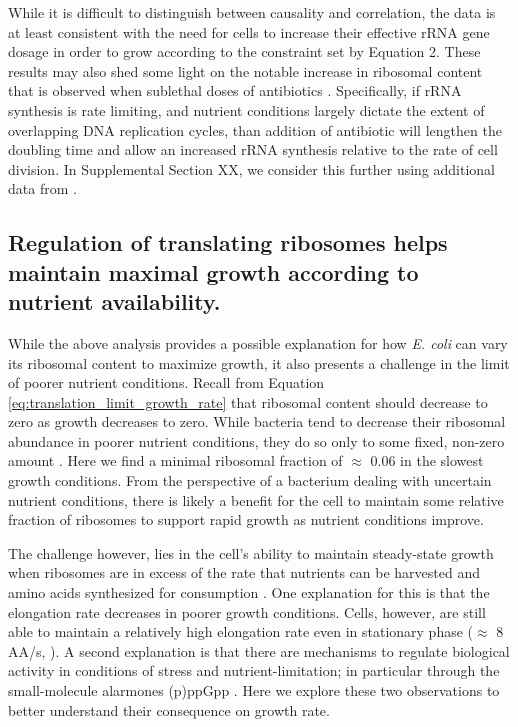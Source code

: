 While it is difficult to distinguish between causality and correlation, the data
is at least consistent with the need for cells to increase their effective rRNA
gene dosage in order to grow according to the constraint set by Equation 2.
These results may also shed some light on the notable increase in ribosomal
content that is observed when sublethal doses of antibiotics \citep{scott2010,
dai2016}. Specifically, if rRNA synthesis is rate limiting, and nutrient
conditions largely dictate the extent of overlapping DNA replication cycles,
than addition of antibiotic will lengthen the doubling time and allow an
increased rRNA synthesis relative to the rate
of cell division. In Supplemental Section XX, we consider this further using
additional data from \cite{si2017}.

\subsection{Regulation of translating ribosomes helps maintain maximal growth
according to nutrient availability.}

While the above analysis provides a possible explanation for how \textit{E. coli}
can vary its ribosomal content to maximize growth, it also presents a
challenge in the limit of poorer nutrient conditions. Recall from Equation
\ref{eq:translation_limit_growth_rate} that ribosomal content should decrease to
zero as growth decreases to zero. While bacteria tend to decrease their
ribosomal abundance in poorer nutrient conditions, they do so only to some
fixed, non-zero amount \citep{scott2010, liebermeister2014}. Here we find a
minimal ribosomal fraction of $\approx$ 0.06 in the slowest growth conditions.
From the perspective of a bacterium dealing with uncertain nutrient conditions,
there is likely a benefit for the cell to maintain some relative fraction of
ribosomes to support rapid growth as nutrient conditions improve.

The challenge however, lies in the cell's ability to maintain steady-state
growth when ribosomes are in excess of the rate that nutrients can be harvested
and amino  acids synthesized for consumption . One
explanation for this is that the elongation rate decreases in poorer growth
conditions. Cells, however, are still able to maintain a relatively high
elongation rate even in stationary phase ($\approx$ 8 AA/s, \citep{dai2016,
dai2018}). A second explanation is that there are mechanisms to regulate
biological activity in conditions of stress and nutrient-limitation; in
particular through the small-molecule alarmones (p)ppGpp \citep{harris2018}.
Here we explore these two observations to better understand their consequence on
growth rate.

